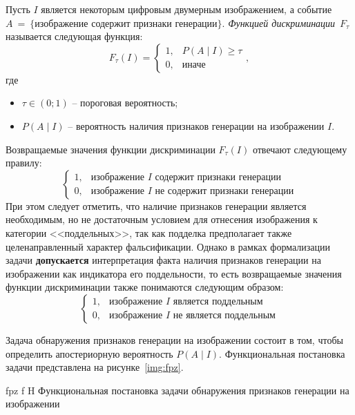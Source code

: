 Пусть $I$ является некоторым цифровым двумерным изображением, а событие $A~=~\{\textit{изображение содержит признаки генерации}\}$. \textit{Функцией дискриминации}~$F_{\tau}$ называется следующая функция:
\begin{equation}
	F_{\tau}(I) = 
	\begin{cases}
		1, & P({A \mid I}) \geqslant \tau \\
		0, & \textit{иначе}
	\end{cases},
\end{equation}
где
\begin{itemize}[label=---]
	\item $\tau \in (0;1)$ -- пороговая вероятность;
	\item $P({A \mid I})$ -- вероятность наличия признаков генерации на изображении $I$.
\end{itemize}
Возвращаемые значения функции дискриминации $F_{\tau}(I)$ отвечают следующему правилу:
\begin{equation}
	\begin{cases}
		1, & \textit{изображение $I$ содержит признаки генерации} \\
		0, & \textit{изображение $I$ не содержит признаки генерации} 
	\end{cases}
\end{equation}
При этом следует отметить, что наличие признаков генерации является необходимым, но не достаточным условием для отнесения изображения к категории <<поддельных>>, так как подделка предполагает также целенаправленный характер фальсификации. Однако в рамках формализации задачи \textbf{допускается} интерпретация факта наличия признаков генерации на изображении как индикатора его поддельности, то есть возвращаемые значения функции дискриминации также понимаются следующим образом:
\begin{equation}
	\begin{cases}
		1, & \textit{изображение $I$ является поддельным} \\
		0, & \textit{изображение $I$ не является поддельным} 
	\end{cases}
\end{equation}

Задача обнаружения признаков генерации на изображении состоит в том, чтобы определить апостериорную вероятность $P(A \mid I)$. Функциональная постановка задачи представлена на рисунке~\ref{img:fpz}.

{fpz}
{f} %
{H}
{\textwidth} %
{Функциональная постановка задачи обнаружения признаков генерации на изображении}

